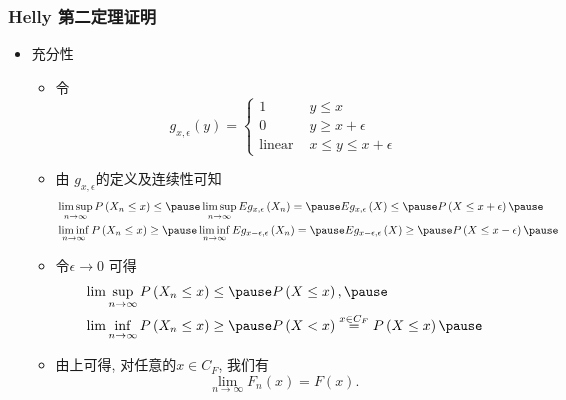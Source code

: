 \begin{frame}
	\frametitle{{\rm Helly} 第二定理证明}
	\begin{itemize}[<+-|alert@+>]
	\item 充分性
	\begin{itemize}[<+-|alert@+>]
		\item 令\[
			g_{x, \epsilon}(y)=\left\{\begin{array}{ll}
			1 & y \leq x \\
			0 & y \geq x+\epsilon \\
			\text {linear } & x \leq y \leq x+\epsilon
			\end{array}\right.
			\]
		\item 由 $g_{x, \epsilon} $的定义及连续性可知 %
    \begin{align*}
		&\limsup _{n \rightarrow \infty} P\left(X_{n} \leq x\right) \leq  \pause \limsup _{n \rightarrow \infty} E g_{x, \epsilon}\left(X_{n}\right)=\pause E g_{x, \epsilon}\left(X\right) \leq \pause P\left(X \leq x+\epsilon\right) \pause \\
		&\liminf _{n \rightarrow \infty} P\left(X_{n} \leq x\right) \geq \pause \liminf _{n \rightarrow \infty} E g_{x-\epsilon, \epsilon}\left(X_{n}\right)=\pause E g_{x-\epsilon, \epsilon}\left(X\right) \geq \pause P\left(X\leq x-\epsilon\right) \pause
	\end{align*}
	\item 令\( \epsilon \rightarrow 0 \) 可得
	\begin{align*}
		&\lim \sup _{n \rightarrow \infty} P\left(X_{n} \leq x\right) \leq  \pause P\left(X\leq x\right), \pause \\
		&\lim \inf _{n \rightarrow \infty} P\left(X_{n} \leq x\right) \geq  \pause P\left(X<x\right)\stackrel{x\in C_F}{=}P\left(X \leq x\right)\pause
	\end{align*}

	 \item 由上可得, 对任意的$x\in C_F$, 我们有
	 \[\lim _{n\rightarrow \infty} F_{n}(x)=F(x).\]
		\end{itemize}
	\end{itemize}

\end{frame}



